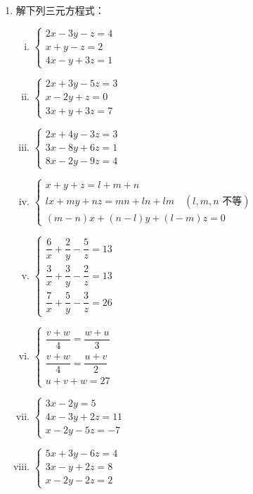 \begin{enumerate}[1.]
  \item 解下列三元方程式：
  \begin{enumerate}[(i)]
    \item 
    $\begin{cases}
      2x-3y-z = 4 \\
      x+y-z = 2 \\
      4x-y+3z = 1
    \end{cases}$
    \item 
    $\begin{cases}
      2x+3y-5z = 3 \\
      x-2y+z = 0 \\
      3x+y+3z = 7
    \end{cases}$
    \item 
    $\begin{cases}
      2x+4y-3z = 3 \\
      3x-8y+6z = 1 \\
      8x-2y-9z = 4
    \end{cases}$
    \item 
    $\begin{cases}
      x+y+z = l+m+n \\
      lx+my+nz = mn+ln+lm \quad (l, m, n \text{ 不等}) \\
      (m-n)x + (n-l)y + (l-m)z = 0
    \end{cases}$
    \item 
    $\begin{cases}
      \dfrac{6}{x} + \dfrac{2}{y} - \dfrac{5}{z} = 13 \\[1em]
      \dfrac{3}{x} + \dfrac{3}{y} - \dfrac{2}{z} = 13 \\[1em]
      \dfrac{7}{x} + \dfrac{5}{y} - \dfrac{3}{z} = 26
    \end{cases}$
    \item 
    $\begin{cases}
      \dfrac{v+w}{4} = \dfrac{w+u}{3} \\[1em]
      \dfrac{v+w}{4} = \dfrac{u+v}{2} \\[1em]
      u+v+w = 27
    \end{cases}$
    \item 
    $\begin{cases}
      3x-2y = 5 \\
      4x-3y+2z = 11 \\
      x-2y-5z = -7
    \end{cases}$
    \item 
    $\begin{cases}
      5x+3y-6z = 4 \\
      3x-y+2z = 8 \\
      x-2y-2z = 2
    \end{cases}$
  \end{enumerate}


\end{enumerate}
